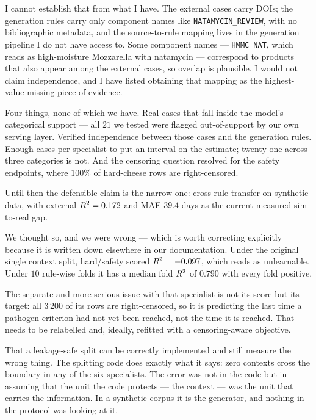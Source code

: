 \begin{questionbox}[title=``Are the external literature cases genuinely independent?'']
I cannot establish that from what I have. The external cases carry DOIs;
the generation rules carry only component names like
\texttt{NATAMYCIN\_REVIEW}, with no bibliographic metadata, and the
source-to-rule mapping lives in the generation pipeline I do not have
access to. Some component names --- \texttt{HMMC\_NAT}, which reads as
high-moisture Mozzarella with natamycin --- correspond to products that
also appear among the external cases, so overlap is plausible. I would not
claim independence, and I have listed obtaining that mapping as the
highest-value missing piece of evidence.
\end{questionbox}

\begin{questionbox}[title=``What would you need before claiming real-world performance?'']
Four things, none of which we have. Real cases that fall inside the
model's categorical support --- all $21$ we tested were flagged
out-of-support by our own serving layer. Verified independence between
those cases and the generation rules. Enough cases per specialist to put
an interval on the estimate; twenty-one across three categories is not.
And the censoring question resolved for the safety endpoints, where
$100\%$ of hard-cheese rows are right-censored.

Until then the defensible claim is the narrow one: cross-rule transfer on
synthetic data, with external $R^2 = 0.172$ and MAE $39.4$ days as the
current measured sim-to-real gap.
\end{questionbox}

\begin{questionbox}[title=``Is the safety-endpoint model broken?'']
We thought so, and we were wrong --- which is worth correcting explicitly
because it is written down elsewhere in our documentation. Under the
original single context split, hard/safety scored $R^2 = -0.097$, which
reads as unlearnable. Under $10$ rule-wise folds it has a median fold
$R^2$ of $0.790$ with every fold positive.

The separate and more serious issue with that specialist is not its score
but its target: all $3\,200$ of its rows are right-censored, so it is
predicting the last time a pathogen criterion had not yet been reached,
not the time it is reached. That needs to be relabelled and, ideally,
refitted with a censoring-aware objective.
\end{questionbox}

\begin{questionbox}[title=``What is the single most important thing you learned?'']
That a leakage-safe split can be correctly implemented and still measure
the wrong thing. The splitting code does exactly what it says: zero
contexts cross the boundary in any of the six specialists. The error was
not in the code but in assuming that the unit the code protects ---
the context --- was the unit that carries the information. In a
synthetic corpus it is the generator, and nothing in the protocol was
looking at it.
\end{questionbox}
